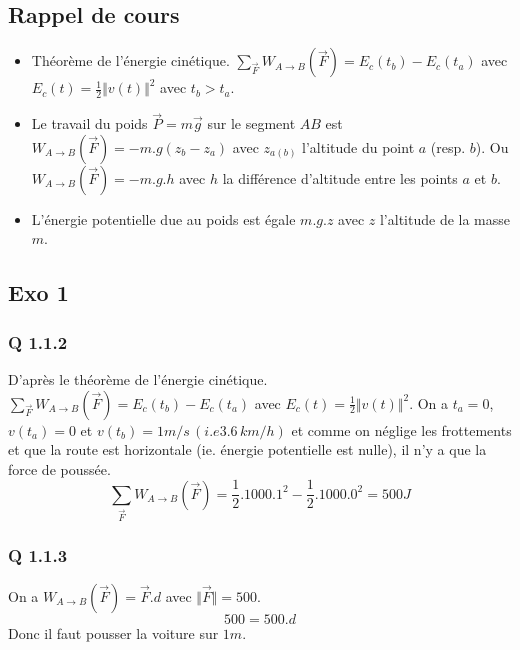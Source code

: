 \documentclass[]{book}
\theoremstyle{definition}
\begin{document}
\subsection*{Rappel de cours}
\begin{itemize}
\item Th\'eor\`eme de l'\'energie cin\'etique. $\sum_{\overrightarrow{F}} W_{A \to B}(\overrightarrow{F}) = E_c(t_b) - E_c(t_a)$ avec $E_c(t) = \frac{1}{2}\Vert v(t) \Vert^2$ avec $t_b>t_a$.
\item Le travail du poids $\overrightarrow{P} = m \overrightarrow{g}$ sur le segment $AB$ est $W_{A \to B}(\overrightarrow{F}) = -m.g(z_b-z_a)$ avec $z_{a(b)}$ l'altitude du point $a$ (resp. $b$). Ou $W_{A \to B}(\overrightarrow{F}) = -m.g.h$ avec $h$ la diff\'erence d'altitude entre les points $a$ et $b$.
\item L'\'energie potentielle due au poids est \'egale $m.g.z$ avec $z$ l'altitude de la masse $m$.
\end{itemize}


\subsection*{Exo 1}

\subsubsection*{Q 1.1.2}
D'apr\`es le th\'eor\`eme de l'\'energie cin\'etique. $\sum_{\overrightarrow{F}}W_{A \to B}(\overrightarrow{F}) = E_c(t_b) - E_c(t_a)$ avec $E_c(t) = \frac{1}{2}\Vert v(t) \Vert^2$. On a $t_a=0$, $v(t_a) = 0$ et $v(t_b) = 1m/s \,(i.e 3.6\, km/h)$ et comme on n\'eglige les frottements et que la route est horizontale (ie. \'energie potentielle est nulle), il n'y a que la force de pouss\'ee.\\
$$\sum_{\overrightarrow{F}}W_{A \to B}(\overrightarrow{F}) = \frac{1}{2}.1000.1^2 - \frac{1}{2}.1000.0^2 = 500J$$

\subsubsection*{Q 1.1.3}
On a $W_{A \to B}(\overrightarrow{F}) = \overrightarrow{F}.d$ avec $\Vert \overrightarrow{F} \Vert = 500$.
$$500 = 500.d$$
Donc il faut pousser la voiture sur $1m$.
\end{document}
